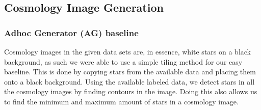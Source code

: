 \documentclass[10pt,conference,compsocconf]{IEEEtran}
\begin{document}




\subsection{Cosmology Image Generation}

\subsubsection{Adhoc Generator (AG) baseline} %
Cosmology images in the given data sets are, in essence, white stars on a black background, as such we were able to use a simple tiling method for our easy baseline. This is done by copying stars from the available data and placing them onto a black background. Using the available labeled data, we detect stars in all the cosmology images by finding contours in the image. Doing this also allows us to find the minimum and maximum amount of stars in a cosmology image.
\end{document}
